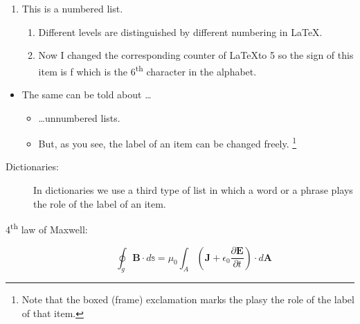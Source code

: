 \documentclass[12pt]{article}
\begin{document}
\begin{enumerate}
\item This is a numbered list.
\begin{enumerate}
\item Different levels are distinguished by different numbering in \LaTeX.
\setcounter{enumii}{5}
\item Now I changed the corresponding counter of \LaTeX to 5 so the sign of this item is f which is the 6\textsuperscript{th} character in the alphabet.
\end{enumerate}
\end{enumerate}

\begin{itemize}
\item The same can be told about \dots
\begin{itemize}
\item \dots unnumbered lists.
\item[\fbox{!!!}] But, as you see, the label of an item can be changed freely. \footnote{Note that the boxed (frame) exclamation marks the plasy the role of the label of that item.}
\end{itemize}
\end{itemize}

\begin{description}
\item[Dictionaries:] In dictionaries we use a third type of list in which a word or a phrase plays the role of the label of an item.
\item[4\textsuperscript{th} law of Maxwell:]
\begin{equation}
\oint_g \mathbf{B}\cdot d\mathbb{s}=\mu_0\int_A\left(\mathbf{J}+\epsilon_0\frac{\partial\mathbf{E}}{\partial t}\right)\cdot d\mathbf{A}
\end{equation}
\end{description}
\end{document}
